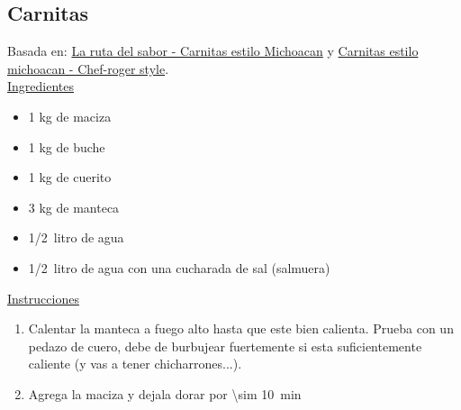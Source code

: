 \subsection{Carnitas}

Basada en: \href{https://www.youtube.com/watch?v=RHBXS7Oo1VM}{La ruta del sabor - Carnitas estilo Michoacan} y \href{https://www.youtube.com/watch?v=3Yz4mSFP9G8}{Carnitas estilo michoacan - Chef-roger style}. \\

\underline{Ingredientes}

\begin{itemize}
\item 1 kg de maciza
\item 1 kg de buche
\item 1 kg de cuerito
\item 3 kg de manteca
\item \SI{1/2}{litro} de agua
\item \SI{1/2}{litro} de agua con una cucharada de sal (salmuera)
\end{itemize}

\underline{Instrucciones}

\begin{enumerate}
\item Calentar la manteca a fuego alto hasta que este bien calienta. Prueba con un pedazo de cuero, debe de burbujear fuertemente si esta suficientemente caliente (y vas a tener chicharrones...).
\item Agrega la maciza y dejala dorar por \SI{\sim 10}{min}
\end{enumerate}
